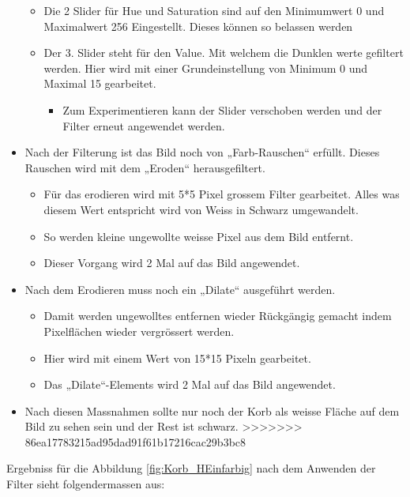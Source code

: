 \begin{itemize}
    \begin{itemize}
        \item Die 2 Slider für Hue und Saturation sind auf den Minimumwert 0 
            und Maximalwert 256 Eingestellt. Dieses können so belassen werden
        \item Der 3. Slider steht für den Value. Mit welchem die Dunklen werte 
            gefiltert werden. Hier wird mit einer Grundeinstellung von Minimum 
            0 und Maximal 15 gearbeitet.
        \begin{itemize}
            \item Zum Experimentieren kann der Slider verschoben werden und 
                der Filter erneut angewendet werden.
        \end{itemize}
    \end{itemize}
    \item Nach der Filterung ist das Bild noch von „Farb-Rauschen“ erfüllt. 
        Dieses Rauschen wird mit dem „Eroden“ herausgefiltert.
    \begin{itemize}
        \item Für das erodieren wird mit 5*5 Pixel grossem Filter gearbeitet. 
            Alles was diesem Wert entspricht wird von Weiss in Schwarz 
            umgewandelt.
        \item So werden kleine ungewollte weisse Pixel aus dem Bild entfernt.
        \item Dieser Vorgang wird 2 Mal auf das Bild angewendet.
    \end{itemize}
    \item Nach dem Erodieren muss noch ein „Dilate“ ausgeführt werden.
    \begin{itemize}
        \item Damit werden ungewolltes entfernen wieder Rückgängig gemacht 
            indem Pixelflächen wieder vergrössert werden.
        \item Hier wird mit einem Wert von 15*15 Pixeln gearbeitet.
        \item Das „Dilate“-Elements wird 2 Mal auf das Bild angewendet.
    \end{itemize}
    \item Nach diesen Massnahmen sollte nur noch der Korb als weisse Fläche 
        auf dem Bild zu sehen sein und der Rest ist schwarz.
>>>>>>> 86ea17783215ad95dad91f61b17216cac29b3bc8
\end{itemize}

Ergebniss für die Abbildung \ref{fig:Korb_HEinfarbig} nach dem Anwenden der 
Filter sieht folgendermassen aus:


